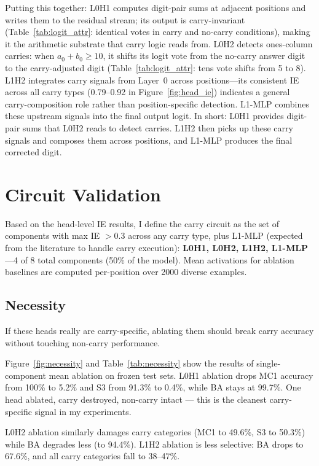 \documentclass{article}
\begin{document}
Putting this together:
L0H1 computes digit-pair sums at adjacent positions and writes them to the residual stream; its output is carry-invariant (Table~\ref{tab:logit_attr}: identical votes in carry and no-carry conditions), making it the arithmetic substrate that carry logic reads from.
L0H2 detects ones-column carries: when $a_0 + b_0 \geq 10$, it shifts its logit vote from the no-carry answer digit to the carry-adjusted digit (Table~\ref{tab:logit_attr}: tens vote shifts from 5 to 8).
L1H2 integrates carry signals from Layer~0 across positions---its consistent IE across all carry types (0.79--0.92 in Figure~\ref{fig:head_ie}) indicates a general carry-composition role rather than position-specific detection.
L1-MLP combines these upstream signals into the final output logit.
In short: L0H1 provides digit-pair sums that L0H2 reads to detect carries. L1H2 then picks up these carry signals and composes them across positions, and L1-MLP produces the final corrected digit.

\section{Circuit Validation}
\label{sec:validation}

Based on the head-level IE results, I define the carry circuit as the set of components with max IE $> 0.3$ across any carry type, plus L1-MLP (expected from the literature to handle carry execution):
\textbf{L0H1, L0H2, L1H2, L1-MLP}---4 of 8 total components (50\% of the model).
Mean activations for ablation baselines are computed per-position over 2000 diverse examples.

\subsection{Necessity}

If these heads really are carry-specific, ablating them should break carry accuracy without touching non-carry performance.

Figure~\ref{fig:necessity} and Table~\ref{tab:necessity} show the results of single-component mean ablation on frozen test sets.
L0H1 ablation drops MC1 accuracy from 100\% to 5.2\% and S3 from 91.3\% to 0.4\%, while BA stays at 99.7\%. One head ablated, carry destroyed, non-carry intact --- this is the cleanest carry-specific signal in my experiments.

L0H2 ablation similarly damages carry categories (MC1 to 49.6\%, S3 to 50.3\%) while BA degrades less (to 94.4\%).
L1H2 ablation is less selective: BA drops to 67.6\%, and all carry categories fall to 38--47\%.
\end{document}
